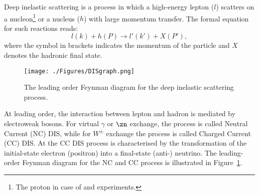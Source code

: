 Deep inelastic scattering is a process in which a high-energy lepton ($l$) scatters on a nucleon\footnote{The proton in case of \hone and \zeus experiments.} or a nucleus ($h$) with large momentum transfer. The formal equation for such reactions reads:
\begin{equation}
l\left( k \right) + h\left( P \right) \rightarrow l'\left( k' \right) + X\left( P' \right),
\label{eq:DISreactions}
\end{equation}
where the symbol in brackets indicates the momentum of the particle and $X$ denotes the hadronic final state.
\begin{figure}
	\centering
		\texttt{[image: ./Figures/DISgraph.png]}
	\caption{The leading order Feynman diagram for the deep inelastic scattering process.}
	\label{fig:DISgraph}
\end{figure}
At leading order, the interaction between lepton and hadron is mediated by electroweak bosons. For virtual $\gamma$ or $\zn$ exchange, the process is called Neutral Current (NC) DIS, while for $W^\pm$ exchange the process is called Charged Current (CC) DIS. At \hera the CC DIS process is characterised by the transformation of the initial-state electron (positron) into a final-state (anti-) neutrino. The leading-order Feynman diagram for the NC and CC process is illustrated in Figure~\ref{fig:DISgraph}.


